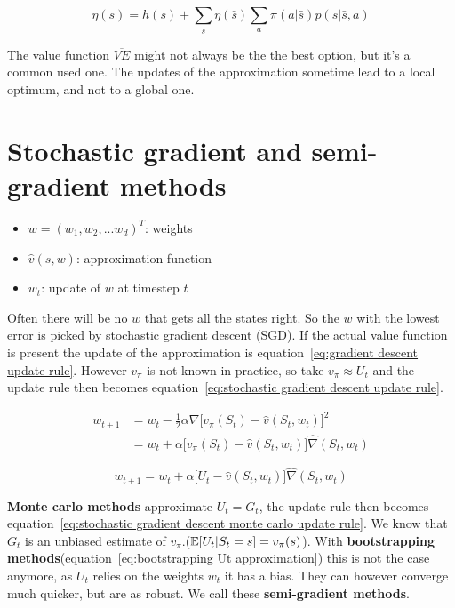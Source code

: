 \begin{equation}
\eta(s) = h(s) + \sum_{\bar{s}} \eta(\bar{s}) \sum_a \pi(a | \bar{s})p(s | \bar{s}, a)
\label{eq:on-policy average time spend in state system of equations}
\end{equation}

The value function $\overline{VE}$ might not always be the the best option, but it's a common used one. The updates of the approximation sometime lead to a local optimum, and not to a global one.

\section{Stochastic gradient and semi-gradient methods}

\begin{itemize}
	\item $w = (w_1, w_2, ... w_d)^T$: weights
	\item $\hat{v}(s, w)$: approximation function
	\item $w_t$: update of $w$ at timestep $t$
\end{itemize}

Often there will be no $w$ that gets all the states right. So the $w$ with the lowest error is picked by stochastic gradient descent (SGD). If the actual value function is present the update of the approximation is equation~\ref{eq:gradient descent update rule}. However $v_{\pi}$ is not known in practice, so take $v_{\pi} \approx U_t$ and the update rule then becomes equation~\ref{eq:stochastic gradient descent update rule}.

\begin{equation}
\begin{split}
w_{t+1} & = w_t - \frac{1}{2} \alpha \nabla \big[ v_{\pi}(S_t) - \hat{v}(S_t, w_t) \big]^2 \\
& = w_t + \alpha \big[ v_{\pi}(S_t) - \hat{v}(S_t, w_t) \big] \hat{\nabla}(S_t, w_t)
\end{split}
\label{eq:gradient descent update rule}
\end{equation}

\begin{equation}
w_{t+1} = w_t + \alpha \big[ U_t - \hat{v}(S_t, w_t) \big] \hat{\nabla}(S_t, w_t)
\label{eq:stochastic gradient descent update rule}
\end{equation}

\textbf{Monte carlo methods} approximate $U_t=G_t$, the update rule then becomes equation~\ref{eq:stochastic gradient descent monte carlo update rule}. We know that $G_t$ is an unbiased estimate of $v_{\pi}$.($\operatorname{\mathbb{E}}[U_t | S_t = s]=v_{\pi}(s)$). With \textbf{bootstrapping methods}(equation~\ref{eq:bootstrapping Ut approximation}) this is not the case anymore, as $U_t$ relies on the weights $w_t$ it has a bias. They can however converge much quicker, but are as robust. We call these \textbf{semi-gradient methods}. 

